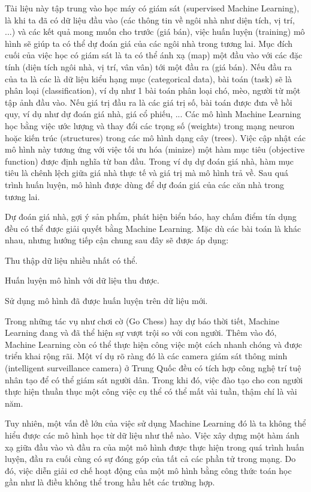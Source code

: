Tài liệu này tập trung vào học máy có giám sát (supervised Machine Learning), là khi ta đã có dữ liệu đầu vào (các thông tin về ngôi nhà như diện tích, vị trí, ...) và các kết quả mong muốn cho trước (giá bán), việc huấn luyện (training) mô hình sẽ giúp ta có thể dự đoán giá của các ngôi nhà trong tương lai. Mục đích cuối của việc học có giám sát là ta có thể ánh xạ (map) một đầu vào với các đặc tính (diện tích ngôi nhà, vị trí, vân vân) tới một đầu ra (giá bán). Nếu đầu ra của ta là các là dữ liệu kiểu hạng mục (categorical data), bài toán (task) sẽ là phân loại (classification), ví dụ như 1 bài toán phân loại chó, mèo, người từ một tập ảnh đầu vào. Nếu giá trị đầu ra là các giá trị số, bài toán được đưa về hồi quy, ví dụ như dự đoán giá nhà, giá cổ phiếu, ... Các mô hình Machine Learning học bằng việc ước lượng và thay đổi các trọng số (weights) trong mạng neuron hoặc kiến trúc (structures) trong các mô hình dạng cây (trees). Việc cập nhật các mô hình này tương ứng với việc tối ưu hóa (minize) một hàm mục tiêu (objective function) được định nghĩa từ ban đầu. Trong ví dụ dự đoán giá nhà, hàm mục tiêu là chênh lệch giữa giá nhà thực tế và giá trị mà mô hình trả về. Sau quá trình huấn luyện, mô hình được dùng để dự đoán giá của các căn nhà trong tương lai.

Dự đoán giá nhà, gợi ý sản phẩm, phát hiện biển báo, hay chấm điểm tín dụng đều có thể được giải quyết bằng Machine Learning. Mặc dù các bài toán là khác nhau, nhưng hướng tiếp cận chung sau đây sẽ được áp dụng:

\begin{packed_enum}
    \item Thu thập dữ liệu nhiều nhất có thể. 
    \item Huấn luyện mô hình với dữ liệu thu được.
    \item Sử dụng mô hình đã được huấn luyện trên dữ liệu mới.
\end{packed_enum}

Trong những tác vụ như chơi cờ (Go Chess) hay dự báo thời tiết, Machine Learning đang và đã thể hiện sự vượt trội so với con người. Thêm vào đó, Machine Learning còn có thể thực hiện công việc một cách nhanh chóng và được triển khai rộng rãi. Một ví dụ rõ ràng đó là các camera giám sát thông minh (intelligent surveillance camera) ở Trung Quốc đều có tích hợp công nghệ trí tuệ nhân tạo để có thể giám sát người dân. Trong khi đó, việc đào tạo cho con người thực hiện thuần thục một công việc cụ thể có thể mất vài tuần, thậm chí là vài năm.

Tuy nhiên, một vấn đề lớn của việc sử dụng Machine Learning đó là ta không thể hiểu được các mô hình học từ dữ liệu như thế nào. Việc xây dựng một hàm ánh xạ giữa đầu vào và đầu ra của một mô hình được thực hiện trong quá trình huấn luyện, đầu ra cuối cùng có sự đóng góp của tất cả các phần tử trong mạng. Do đó, việc diễn giải cơ chế hoạt động của một mô hình bằng công thức toán học gần như là điều không thể trong hầu hết các trường hợp. 

